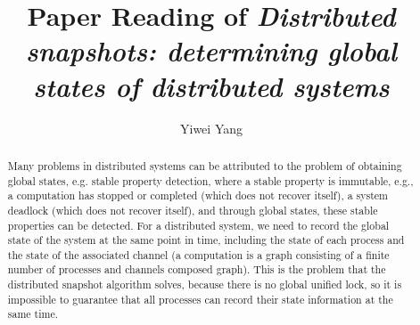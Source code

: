 \documentclass[acmlarge]{acmart}
\begin{document}
\title{Paper Reading of \textit{Distributed snapshots: determining global states of distributed systems}}

\author{Yiwei Yang}

\renewcommand{\shortauthors}{Yiwei Yang}

\begin{abstract}
  Many problems \cite{chandy1985distributed} in distributed systems can be attributed to the problem of obtaining global states, e.g. stable property detection, where a stable property is immutable, e.g., a computation has stopped or completed (which does not recover itself), a system deadlock (which does not recover itself), and through global states, these stable properties can be detected.
  For a distributed system, we need to record the global state of the system at the same point in time, including the state of each process and the state of the associated channel (a computation is a graph consisting of a finite number of processes and channels composed graph). This is the problem that the distributed snapshot algorithm solves, because there is no global unified lock, so it is impossible to guarantee that all processes can record their state information at the same time.
\end{abstract}
\end{document}
